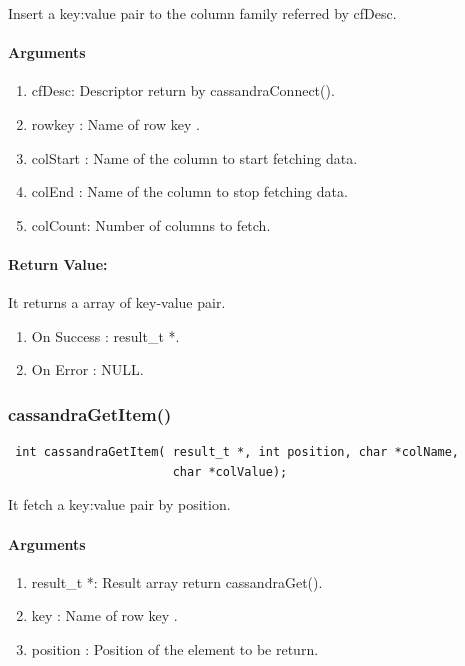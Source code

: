   Insert  a key:value pair to the column family referred by cfDesc.

  \paragraph{Arguments}
  \begin{enumerate}
   \item cfDesc: Descriptor return by cassandraConnect().
   \item rowkey : Name of row key .
   \item colStart :  Name of the column to start fetching data.
   \item colEnd : Name of the column to stop fetching data.
   \item colCount: Number of columns to fetch.
  \end{enumerate}

 \paragraph{Return Value:}
 It returns a array of key-value pair.
  \begin{enumerate}
 \item On Success : result\_t *.
 \item On Error   : NULL.
\end{enumerate}

\subsubsection{cassandraGetItem()}
\begin{verbatim}
 int cassandraGetItem( result_t *, int position, char *colName, 
                       char *colValue);
\end{verbatim}

  It fetch  a key:value pair by position.

  \paragraph{Arguments}
  \begin{enumerate}
   \item result\_t *: Result array return cassandraGet().
   \item key : Name of row key .
   \item position : Position of the element to be return. 
  \end{enumerate}
